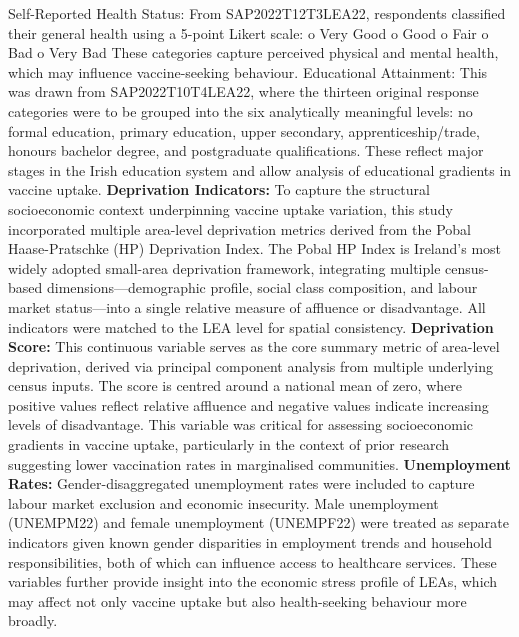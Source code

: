 \documentclass{article}
\begin{document}
Self-Reported Health Status: From SAP2022T12T3LEA22, respondents
classified their general health using a 5-point Likert scale: o Very
Good o Good o Fair o Bad o Very Bad These categories capture perceived
physical and mental health, which may influence vaccine-seeking
behaviour. Educational Attainment: This was drawn from
SAP2022T10T4LEA22, where the thirteen original response categories were
to be grouped into the six analytically meaningful levels: no formal
education, primary education, upper secondary, apprenticeship/trade,
honours bachelor degree, and postgraduate qualifications. These reflect
major stages in the Irish education system and allow analysis of
educational gradients in vaccine uptake. \textbf{Deprivation
Indicators:} To capture the structural socioeconomic context
underpinning vaccine uptake variation, this study incorporated multiple
area-level deprivation metrics derived from the Pobal Haase-Pratschke
(HP) Deprivation Index. The Pobal HP Index is Ireland's most widely
adopted small-area deprivation framework, integrating multiple
census-based dimensions---demographic profile, social class composition,
and labour market status---into a single relative measure of affluence
or disadvantage. All indicators were matched to the LEA level for
spatial consistency. \textbf{Deprivation Score:} This continuous
variable serves as the core summary metric of area-level deprivation,
derived via principal component analysis from multiple underlying census
inputs. The score is centred around a national mean of zero, where
positive values reflect relative affluence and negative values indicate
increasing levels of disadvantage. This variable was critical for
assessing socioeconomic gradients in vaccine uptake, particularly in the
context of prior research suggesting lower vaccination rates in
marginalised communities. \textbf{Unemployment Rates:}
Gender-disaggregated unemployment rates were included to capture labour
market exclusion and economic insecurity. Male unemployment (UNEMPM22)
and female unemployment (UNEMPF22) were treated as separate indicators
given known gender disparities in employment trends and household
responsibilities, both of which can influence access to healthcare
services. These variables further provide insight into the economic
stress profile of LEAs, which may affect not only vaccine uptake but
also health-seeking behaviour more broadly.
\end{document}
